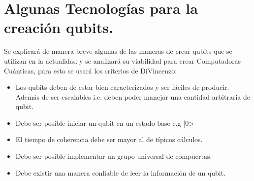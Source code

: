 \section{Algunas Tecnologías para la creación qubits.}

Se explicará de manera breve algunas de las maneras de crear qubits que se utilizan en la actualidad y se analizará su viabilidad para crear Computadoras Cuánticas, para esto se usará los criterios de DiVincenzo:

\begin{itemize}
    \item Los qubits deben de estar bien caracterizados y ser fáciles de producir. Además de ser escalables i.e. deben poder manejar una cantidad arbitraria de qubit.
    \item Debe ser posible iniciar un qubit en un estado base e.g |0>
    \item El tiempo de coherencia debe ser mayor al de típicos cálculos.
    \item Debe ser posible implementar un grupo universal de compuertas.
    \item Debe existir una manera confiable de leer la información de un qubit.
    
\end{itemize}

